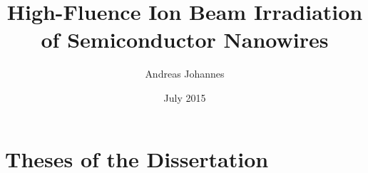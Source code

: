 \titlehead{Friedrich Schiller Universität Jena\\
PAF}
\subject{Dissertation}
\title{High-Fluence Ion Beam Irradiation of Semiconductor Nanowires}
\author{Andreas Johannes}
\date{July 2015}
\maketitle






\vspace*{-4cm}\section*{Theses of the Dissertation}

\setcounter{page}{1}


